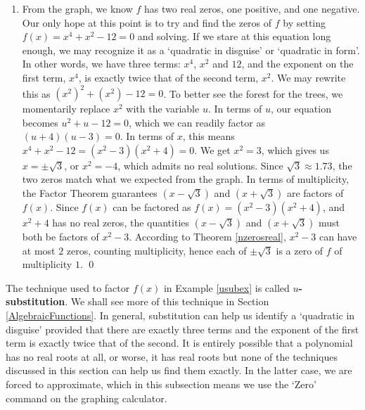 \begin{ex}
\begin{enumerate}
\item  From the graph, we know $f$ has two real zeros, one positive, and one negative.  Our only hope at this point is to try and find the zeros of $f$ by setting $f(x)=x^4+x^2-12=0$ and solving.  If we stare at this equation long enough, we may recognize it as a `quadratic in disguise' or `quadratic in form'.   In other words, we have three terms: $x^4$, $x^2$ and $12$, and the exponent on the first term, $x^4$, is exactly twice that of the second term, $x^2$.  We may rewrite this as $\left(x^2\right)^2 + \left(x^2\right) - 12 = 0$.  To better see the forest for the trees, we momentarily replace $x^2$ with the variable $u$.  In terms of $u$, our equation becomes $u^2 + u - 12 = 0$, which we can readily factor as $(u+4)(u-3) = 0$.  In terms of $x$, this means $x^4+x^2-12= \left(x^2-3\right) \left(x^2 + 4 \right)=0$. We get $x^2 = 3$, which gives us $x = \pm \sqrt{3}$, or $x^2=-4$, which admits no real solutions.  Since $\sqrt{3} \approx 1.73$, the two zeros match what we expected from the graph.  In terms of multiplicity, the Factor Theorem guarantees $\left(x - \sqrt{3}\right)$ and $\left(x + \sqrt{3}\right)$ are factors of $f(x)$.  Since $f(x)$ can be factored as $f(x) = \left(x^2-3\right) \left(x^2 + 4 \right)$, and $x^2 + 4$ has no real zeros, the quantities $\left(x - \sqrt{3}\right)$ and $\left(x + \sqrt{3}\right)$ must both be factors of $x^2-3$.  According to Theorem \ref{nzerosreal}, $x^2-3$ can have at most $2$ zeros, counting multiplicity, hence each of $\pm \sqrt{3}$ is a zero of $f$ of multiplicity $1$. \qed

\end{enumerate}

\label{usubex}

\end{ex}

The technique used to factor $f(x)$ in Example \ref{usubex} is called  \textbf{{\boldmath $u$}-substitution}.  We shall see more of this technique in Section \ref{AlgebraicFunctions}.  In general, substitution can help us identify a `quadratic in disguise' provided that there are exactly three terms and the exponent of the first term is exactly twice that of the second.  It is entirely possible that a polynomial has no real roots at all, or worse, it has real roots but none of the techniques discussed in this section can help us find them exactly.  In the latter case, we are forced to approximate, which in this subsection means we use the `Zero' command on the graphing calculator.  


